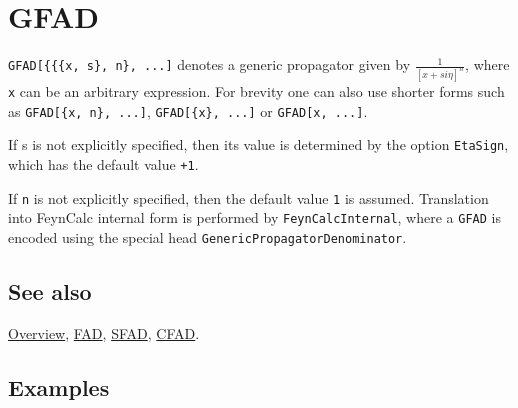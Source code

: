 \documentclass[../FeynCalcManual.tex]{subfiles}
\begin{document}
\hypertarget{gfad}{
\section{GFAD}\label{gfad}}

\texttt{GFAD[\allowbreak{}\{\allowbreak{}\{\allowbreak{}\{\allowbreak{}x,\ \allowbreak{}s\},\ \allowbreak{}n\},\ \allowbreak{}...]}
denotes a generic propagator given by \(\frac{1}{[x + s i \eta]^n}\),
where \texttt{x} can be an arbitrary expression. For brevity one can
also use shorter forms such as
\texttt{GFAD[\allowbreak{}\{\allowbreak{}x,\ \allowbreak{}n\},\ \allowbreak{}...]},
\texttt{GFAD[\allowbreak{}\{\allowbreak{}x\},\ \allowbreak{}...]} or
\texttt{GFAD[\allowbreak{}x,\ \allowbreak{}...]}.

If s is not explicitly specified, then its value is determined by the
option \texttt{EtaSign}, which has the default value \texttt{+1}.

If \texttt{n} is not explicitly specified, then the default value
\texttt{1} is assumed. Translation into FeynCalc internal form is
performed by \texttt{FeynCalcInternal}, where a \texttt{GFAD} is encoded
using the special head \texttt{GenericPropagatorDenominator}.

\subsection{See also}

\hyperlink{toc}{Overview}, \hyperlink{fad}{FAD}, \hyperlink{sfad}{SFAD},
\hyperlink{cfad}{CFAD}.

\subsection{Examples}

\begin{Shaded}
\begin{Highlighting}[]
\OperatorTok{[} \OperatorTok{[}\OperatorTok{,} \OperatorTok{]}\OperatorTok{[}\OperatorTok{,} \OperatorTok{]} \SpecialCharTok{+} \OperatorTok{[}\OperatorTok{,}\OperatorTok{]]} 
 
\OperatorTok{[}\SpecialCharTok{\%}\OperatorTok{]} 
 
\SpecialCharTok{\%} \SpecialCharTok{//}\SpecialCharTok{//} 
\end{Highlighting}
\end{Shaded}
\end{document}
